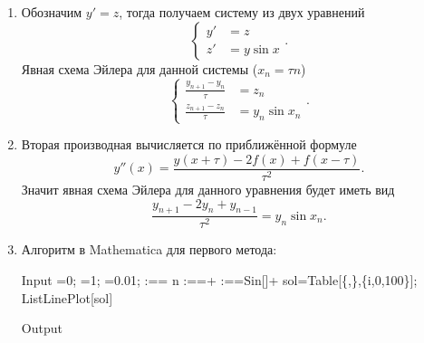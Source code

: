 \documentclass[a4paper]{article}
\begin{document}
\begin{sol}
\renewcommand{\labelenumi}{\asbuk{enumi})}
\begin{enumerate}
\item Обозначим $y'=z$, тогда получаем систему из двух
	уравнений
	 \[
	\left\{
	\begin{aligned}
		y'&=z \\
		z'&=y \sin x
	\end{aligned}
	\right.
	.\] 
	Явная схема Эйлера для данной системы ($x_n=\tau n$)
	\[
	\left\{
	\begin{aligned}
		\frac{y_{n+1}-y_n}{\tau}&=z_n\\
	\frac{z_{n+1}-z_n}{\tau}&=y_n \sin x_n
	\end{aligned}
	\right.
	.\] 
\item Вторая производная вычисляется по приближённой формуле
	\[
		y''(x)= \frac{y(x+\tau)-2f(x)+f(x-\tau)}{\tau^2}
	.\]
Значит явная схема Эйлера для данного уравнения будет иметь вид
\[
\frac{y_{n+1}-2 y_n+y_{n-1}}{\tau^2}=y_n \sin x_n
.\] 
\item Алгоритм в Mathematica для первого метода:
\begin{mmaCell}[morepattern={n_, n},moredefined={sol,ListLinePlot},morefunctionlocal={i}]{Input}
  =0;
  =1;
  \mmaDef{\(\pmb{\tau}\)}=0.01;
  :==\mmaDef{\(\pmb{\tau}\)} n
  :==\mmaDef{\(\pmb{\tau}\)}+
  :==Sin[]\mmaDef{\(\pmb{\tau}\)}+
  sol=Table[\{,\},\{i,0,100\}];
  ListLinePlot[sol]
  
\end{mmaCell}
 \begin{mmaCell}[moregraphics={moreig={scale=.5}}]{Output}
 \end{mmaCell}
\end{enumerate}
\end{sol}
\end{document}
